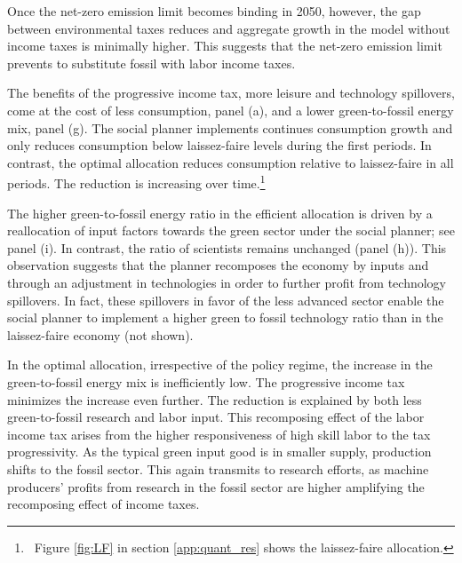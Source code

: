 Once the net-zero emission limit becomes binding in 2050, however, the gap between environmental taxes reduces and aggregate growth in the model without income taxes is minimally higher.   This suggests that the net-zero emission limit prevents to substitute fossil with labor income taxes. 

The benefits of the progressive income tax, more leisure and technology spillovers, come at the cost of less consumption, panel (a),  and a lower green-to-fossil energy mix, panel (g). The social planner implements continues consumption growth and only reduces consumption below laissez-faire levels during the first periods. In contrast, the optimal allocation reduces consumption relative to laissez-faire in all periods. The reduction is increasing over time.\footnote{\ Figure \ref{fig:LF} in section \ref{app:quant_res} shows the laissez-faire allocation. } 

The higher green-to-fossil energy ratio in the efficient allocation is driven by a reallocation of input factors towards the green sector under the social planner; see panel (i). In contrast, the ratio of scientists remains unchanged (panel (h)). This observation suggests that the planner recomposes the economy by inputs and through an adjustment in technologies in order to further profit from technology spillovers. In fact, these spillovers in favor of the less advanced sector enable the social planner to implement a higher green to fossil technology ratio than in the laissez-faire economy (not shown). 

In the optimal allocation, irrespective of the policy regime, the increase in the green-to-fossil energy mix is inefficiently low. The progressive income tax minimizes the increase even further. The reduction is explained by both less green-to-fossil research and labor input. This recomposing effect of the labor income tax arises from the higher responsiveness of high skill labor to the tax progressivity. As the typical green input good is in smaller supply, production shifts to the fossil sector. This again transmits to research efforts, as machine producers' profits from research in the fossil sector are higher amplifying the recomposing effect of income taxes. 

